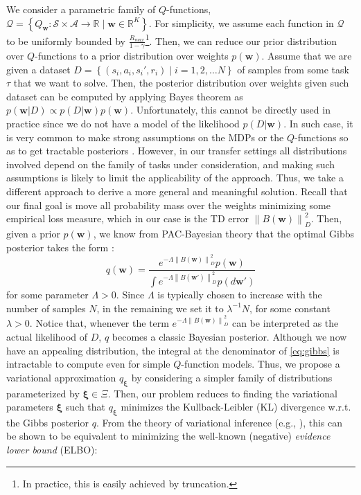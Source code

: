 \documentclass{article}
\newcommand{\norm}[1]{\left\lVert #1 \right\rVert}
\begin{document}
We consider a parametric family of $Q$-functions, $\mathcal{Q} = \left\{ Q_{\bm{w}} : \mathcal{S}\times\mathcal{A} \rightarrow \mathbb{R} \mid \bm{w}\in\mathbb{R}^K\right\}$. For simplicity, we assume each function in $\mathcal{Q}$ to be uniformly bounded by $\frac{R_{max}}{1-\gamma}$\footnote{In practice, this is easily achieved by truncation.}. Then, we can reduce our prior distribution over $Q$-functions to a prior distribution over weights $p(\bm{w})$. Assume that we are given a dataset $D=\left\{(s_i,a_i,s_i',r_i) \mid i = 1,2,\dots N\right\}$ of samples from some task $\tau$ that we want to solve. Then, the posterior distribution over weights given such dataset can be computed by applying Bayes theorem as $p(\bm{w} | D) \propto p(D | \bm{w})p(\bm{w})$. Unfortunately, this cannot be directly used in practice since we do not have a model of the likelihood $p(D|\bm{w})$. In such case, it is very common to make strong assumptions on the MDPs or the $Q$-functions so as to get tractable posteriors \cite{}. However, in our transfer settings all distributions involved depend on the family of tasks under consideration, and making such assumptions is likely to limit the applicability of the approach. Thus, we take a different approach to derive a more general and meaningful solution. Recall that our final goal is move all probability mass over the weights minimizing some empirical loss measure, which in our case is the TD error $\norm{B(\bm{w})}_D^2$. Then, given a prior $p(\bm{w})$, we know from PAC-Bayesian theory that the optimal Gibbs posterior takes the form \cite{}:
\begin{equation}\label{eq:gibbs}
q(\bm{w}) = \frac{e^{-\Lambda\norm{B(\bm{w})}_D^2}p(\bm{w})}{\int e^{-\Lambda\norm{B(\bm{w}')}_D^2}p(d\bm{w}')}
\end{equation}
for some parameter $\Lambda > 0$. Since $\Lambda$ is typically chosen to increase with the number of samples $N$, in the remaining we set it to $\lambda^{-1}N$, for some constant $\lambda > 0$. Notice that, whenever the term $e^{-\Lambda\norm{B(\bm{w})}_D^2}$ can be interpreted as the actual likelihood of $D$, $q$ becomes a classic Bayesian posterior. Although we now have an appealing distribution, the integral at the denominator of \eqref{eq:gibbs} is intractable to compute even for simple $Q$-function models. Thus, we propose a variational approximation $q_{\bm{\xi}}$ by considering a simpler family of distributions parameterized by $\bm{\xi} \in \Xi$. Then, our problem reduces to finding the variational parameters $\bm{\xi}$ such that $q_{\bm{\xi}}$ minimizes the Kullback-Leibler (KL) divergence w.r.t. the Gibbs posterior $q$. From the theory of variational inference (e.g., \cite{}), this can be shown to be equivalent to minimizing the well-known (negative) \textit{evidence lower bound} (ELBO):
\end{document}
